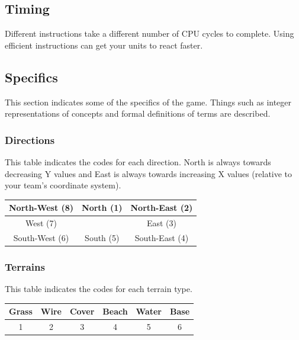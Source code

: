 \documentclass{article}
\begin{document}
\subsection{Timing}

Different instructions take a different number of CPU cycles to complete. Using
efficient instructions can get your units to react faster.

\subsection{Specifics}

This section indicates some of the specifics of the game. Things such as integer
representations of concepts and formal definitions of terms are described.

\subsubsection{Directions}

This table indicates the codes for each direction. North is always towards
decreasing Y values and East is always towards increasing X values (relative to
your team's coordinate system).

\begin{minipage}{\textwidth}
\centering
\begin{tabular}{|c|c|c|}
    \hline North-West (8) & North (1) & North-East (2) \\ \hline
    West (7) & & East (3) \\ \hline
    South-West (6) & South (5) & South-East (4) \\ \hline
\end{tabular}
\end{minipage}

\subsubsection{Terrains}

This table indicates the codes for each terrain type.

\begin{minipage}{\textwidth}
\centering
\begin{tabular}{c|c|c|c|c|c}
    Grass & Wire & Cover & Beach & Water & Base \\ \hline
    1 & 2 & 3 & 4 & 5 & 6
\end{tabular}
\end{minipage}
\end{document}
